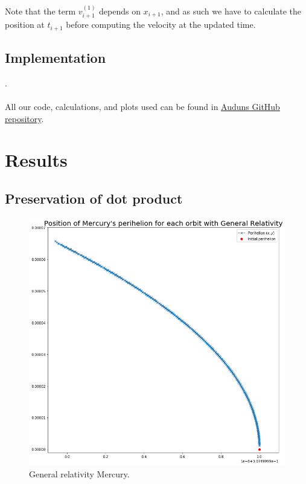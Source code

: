 \documentclass[a4paper, fontsize=11pt]{article}
\begin{document}
Note that the term $v_{i+1}^{(1)}$ depends on $x_{i+1}$, and as such we have to calculate the position at $t_{i+1}$ before computing the velocity at the updated time. \cite{ODE}

\subsection{Implementation}

.\cite{H-Jensen} 


\paragraph{}
All our code, calculations, and plots used can be found in \href{https://github.com/auduntre/FYS4150/tree/master/Project%203}{Auduns GitHub repository}.

\section{Results}
\subsection{Preservation of dot product}

\begin{figure}[H]
\centering
\includegraphics[scale=0.5]{plots/GeneralRelativityMercury}
\caption{General relativity Mercury.}
\label{GRMercury}
\end{figure}
\end{document}
